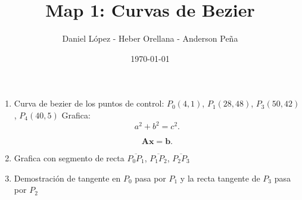 \documentclass[11pt]{article}
\begin{document}
\author{Daniel López - Heber Orellana - Anderson Peña} \date{\today}
\title{Map 1: Curvas de Bezier}
\maketitle

\medskip

\begin{enumerate}

\item
Curva de bezier de los puntos de control: $P_0(4,1)$, $P_1(28,48)$, $P_3(50,42)$, $P_4(40,5)$
Grafica:
\begin{equation}
    a^2 + b^2 = c^2.
\end{equation}


\begin{equation}
    \mathbf{A} \mathbf{x} = \mathbf{b}.
\end{equation}

\item
Grafica con segmento de recta $\overline{P_0 P_1}$, $\overline{P_1 P_2}$, $\overline{P_2 P_3}$

\item
Demostración de tangente en $P_0$ pasa por $P_1$ y la recta tangente de  $P_3$ pasa por $P_2$


\end{enumerate}
\end{document}
